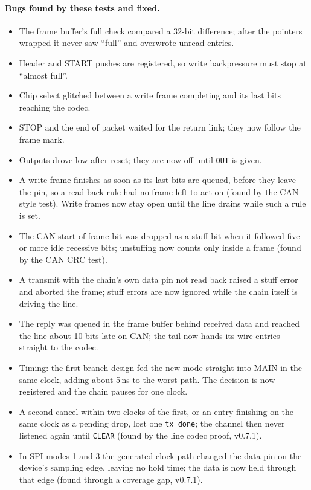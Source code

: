 \documentclass[11pt,a4paper]{article}
\newcommand{\sig}[1]{\texttt{#1}}
\begin{document}
\paragraph{Bugs found by these tests and fixed.}
\begin{itemize}
\item The frame buffer's full check compared a 32-bit difference; after the pointers wrapped it never saw ``full'' and overwrote unread entries.
\item Header and START pushes are registered, so write backpressure must stop at ``almost full''.
\item Chip select glitched between a write frame completing and its last bits reaching the codec.
\item STOP and the end of packet waited for the return link; they now follow the frame mark.
\item Outputs drove low after reset; they are now off until \sig{OUT} is given.
\item A write frame finishes as soon as its last bits are queued, before they leave the pin, so a read-back rule had no frame left to act on (found by the CAN-style test). Write frames now stay open until the line drains while such a rule is set.
\item The CAN start-of-frame bit was dropped as a stuff bit when it followed five or more idle recessive bits; unstuffing now counts only inside a frame (found by the CAN CRC test).
\item A transmit with the chain's own data pin not read back raised a stuff error and aborted the frame; stuff errors are now ignored while the chain itself is driving the line.
\item The reply was queued in the frame buffer behind received data and reached the line about 10 bits late on CAN; the tail now hands its wire entries straight to the codec.
\item Timing: the first branch design fed the new mode straight into MAIN in the same clock, adding about 5\,ns to the worst path. The decision is now registered and the chain pauses for one clock.
\item A second cancel within two clocks of the first, or an entry finishing on the same clock as a pending drop, lost one \sig{tx\_done}; the channel then never listened again until \sig{CLEAR} (found by the line codec proof, v0.7.1).
\item In SPI modes 1 and 3 the generated-clock path changed the data pin on the device's sampling edge, leaving no hold time; the data is now held through that edge (found through a coverage gap, v0.7.1).
\end{itemize}
\end{document}
